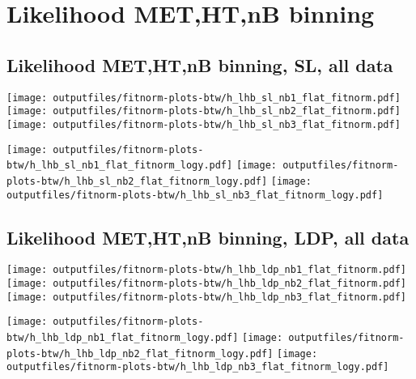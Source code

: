 \documentclass[11pt]{article}
\begin{document}
   \clearpage







   \section{Likelihood MET,HT,nB binning}
    \subsection{ Likelihood MET,HT,nB binning, SL, all data}

    \noindent
     \texttt{[image: outputfiles/fitnorm-plots-btw/h\_lhb\_sl\_nb1\_flat\_fitnorm.pdf]}
     \texttt{[image: outputfiles/fitnorm-plots-btw/h\_lhb\_sl\_nb2\_flat\_fitnorm.pdf]}
     \texttt{[image: outputfiles/fitnorm-plots-btw/h\_lhb\_sl\_nb3\_flat\_fitnorm.pdf]}

    \noindent
     \texttt{[image: outputfiles/fitnorm-plots-btw/h\_lhb\_sl\_nb1\_flat\_fitnorm\_logy.pdf]}
     \texttt{[image: outputfiles/fitnorm-plots-btw/h\_lhb\_sl\_nb2\_flat\_fitnorm\_logy.pdf]}
     \texttt{[image: outputfiles/fitnorm-plots-btw/h\_lhb\_sl\_nb3\_flat\_fitnorm\_logy.pdf]}

    \clearpage






    \subsection{ Likelihood MET,HT,nB binning, LDP, all data}

    \noindent
     \texttt{[image: outputfiles/fitnorm-plots-btw/h\_lhb\_ldp\_nb1\_flat\_fitnorm.pdf]}
     \texttt{[image: outputfiles/fitnorm-plots-btw/h\_lhb\_ldp\_nb2\_flat\_fitnorm.pdf]}
     \texttt{[image: outputfiles/fitnorm-plots-btw/h\_lhb\_ldp\_nb3\_flat\_fitnorm.pdf]}

    \noindent
     \texttt{[image: outputfiles/fitnorm-plots-btw/h\_lhb\_ldp\_nb1\_flat\_fitnorm\_logy.pdf]}
     \texttt{[image: outputfiles/fitnorm-plots-btw/h\_lhb\_ldp\_nb2\_flat\_fitnorm\_logy.pdf]}
     \texttt{[image: outputfiles/fitnorm-plots-btw/h\_lhb\_ldp\_nb3\_flat\_fitnorm\_logy.pdf]}
\end{document}
